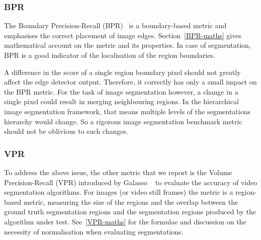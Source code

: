 \subsubsection*{BPR}
The Boundary Precision-Recall (BPR)~\cite{Arbelaez11} is a boundary-based metric and emphasises the correct placement of image edges. Section~\ref{BPR-maths} gives mathematical account on the metric and its properties. In case of segmentation, BPR is a good indicator of the localisation of the region boundaries.

A difference in the score of a single region boundary pixel should not greatly affect the edge detector output. Therefore, it correctly has only a small impact on the BPR metric. For the task of image segmentation however, a change in a single pixel could result in merging neighbouring regions. In the hierarchical image segmentation framework, that means multiple levels of the segmentations hierarchy would change. So a rigorous image segmentation benchmark metric should not be oblivious to such changes.

\subsubsection*{VPR}
To address the above issue, the other metric that we report is the Volume Precision-Recall (VPR) introduced by Galasso \etal~\cite{Galasso13} to evaluate the accuracy of video segmentation algorithms. For images (or video still frames) the metric is a region-based metric, measuring the size of the regions and the overlap between the ground truth segmentation regions and the segmentation regions produced by the algorithm under test. See~\ref{VPR-maths} for the formulae and discussion on the necessity of %
normalisation when evaluating segmentations.



